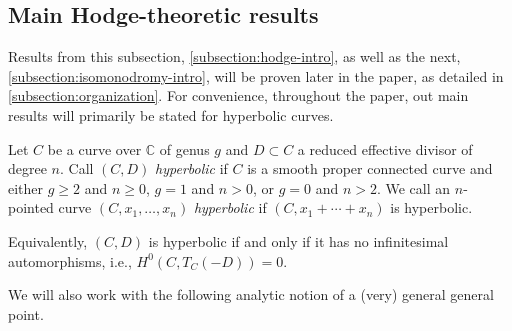 \subsection{Main Hodge-theoretic results}
\label{subsection:hodge-intro}
Results from this subsection, \autoref{subsection:hodge-intro}, as well as the
next, \autoref{subsection:isomonodromy-intro}, will be proven later in the
paper, as detailed in \autoref{subsection:organization}.
For convenience, throughout the paper, out main results will primarily be stated for hyperbolic curves.
\begin{definition}
\notready
	\label{definition:hyperbolic}
	Let $C$ be a curve over $\mathbb C$ of genus $g$ and $D \subset C$ a
	reduced effective divisor of degree $n$.
	Call $(C, D)$ {\em hyperbolic} if $C$ is a smooth proper connected curve
	and
	either $g \geq 2$ and $n\geq 0$, $g = 1$ and $n > 0$, or $g =0$ and $n > 2$.
	We call an $n$-pointed curve $(C, x_1, \ldots, x_n)$ {\em hyperbolic} if
	$(C, x_1 +\cdots + x_n)$ is hyperbolic.
\end{definition}
\begin{remark}
\notready
	\label{remark:}
	Equivalently, $(C,D)$ is hyperbolic if and only if it has no infinitesimal automorphisms,
i.e., $H^0(C, T_C(-D)) = 0$.
\end{remark}

We will also work with the following analytic notion of a (very) general general point.

